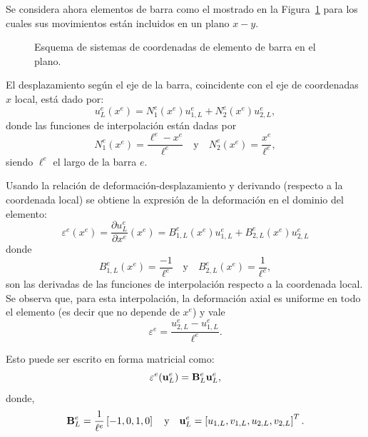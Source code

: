 Se considera ahora elementos de barra como el mostrado en la Figura~\ref{fig:eleplabar} para los cuales sus movimientos están incluidos en un plano $x-y$. %
%
\begin{figure}[htb]
	\centering
  \def\svgwidth{0.5\textwidth}
  
	\caption{Esquema de sistemas de coordenadas de elemento de barra en el plano.}
	\label{fig:eleplabar}
\end{figure}

El desplazamiento según el eje de la barra, coincidente con el eje de coordenadas $x$ local, está dado por:
%
\begin{equation}
u_L^e(x^e) = N_1^e(x^e) u_{1,L}^e  + N_2^e(x^e) u_{2,L}^e,
\end{equation}
%
donde las funciones de interpolación están dadas por
%
\begin{equation}
N_1^e(x^e) = \frac{\ell^e - x^e}{\ell^e}
\quad \text{y} \quad N_2^e(x^e) = \frac{x^e}{\ell^e},
\end{equation}
%
siendo $\ell^e$ el largo de la barra $e$.


%
Usando la relación de deformación-desplazamiento y derivando (respecto a la coordenada local) se obtiene la expresión de la deformación en el dominio del elemento:
%
\begin{equation}
\varepsilon^e(x^e) = \frac{\partial u^e_L}{\partial x^e}(x^e) =  B_{1,L}^e(x^e) u_{1,L}^e  + B_{2,L}^e(x^e) u_{2,L}^e
\end{equation}
%
donde 
\begin{equation}
B_{1,L}^e(x^e) = \frac{- 1}{\ell^e}
\quad \text{y} \quad B_{2,L}^e(x^e) = \frac{1}{\ell^e},
\end{equation}
son las derivadas de las funciones de interpolación respecto a la coordenada local. %
%
Se observa que, para esta interpolación, la deformación axial es uniforme en todo el elemento (es decir que no depende de $x^e$) y vale 
%
\begin{equation}
\varepsilon^e  =  \frac{ u_{2,L}^e - u_{1,L}^e } {\ell^e}.
\end{equation}


Esto puede ser escrito en forma matricial como:
%
\begin{equation} \label{eqn:expreps}
\varepsilon^e ({\bf u}^e_L) = {\bf B}_L^e {\bf u}^e_L,
\end{equation}
%
donde,
%
\begin{equation}
{\bf B}_L^e = \frac{1}{\ell^e} \left[-1, 0, 1, 0\right]
\quad \text{y} \quad
{\bf u}_L^e = \left[u_{1,L}, v_{1,L}, u_{2,L}, v_{2,L}\right]^T.
\end{equation}

